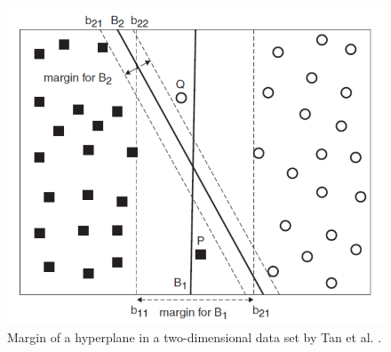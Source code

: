     \begin{figure}
        \centering
        \caption{Margin of a hyperplane in a two-dimensional data set by Tan et al. \cite{DBLP:books/aw/TanSKK2019}.
        \label{fig:svm}
        }
        \includegraphics[scale=0.7]{Images/SVM_image.png}
    \end{figure}
    


    